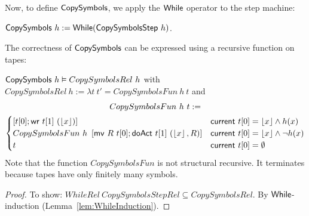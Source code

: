 Now, to define $\MS{CopySymbols}$, we apply the $\mathsf{While}$ operator to the step machine:
\begin{definition}[$\MS{CopySymbols}$]
  \label{def:CopySymbols}
  $\mathsf{CopySymbols}~h := \mathsf{While}(\mathsf{CopySymbolsStep}~h)$.
\end{definition}

The correctness of $\MS{CopySymbols}$ can be expressed using a recursive function on tapes:
\begin{lemma}
  \label{lem:CopySymbols_Realise}
  $\mathsf{CopySymbols}~h \mathrel{\vDash} CopySymbolsRel~h$
  with $CopySymbolsRel~h := \lambda t~t' = CopySymbolsFun~h~t$ and
  \begin{multline*}
    CopySymbolsFun~h~t :=\\
    \begin{cases}
      \left[ t[0]; \mathsf{wr}~t[1]~(\left\lfloor {x} \right\rfloor) \right]                                  & \mathsf{current}~t[0]=\left\lfloor {x} \right\rfloor \land h(x) \\
      CopySymbolsFun~h~\left[ \mathsf{mv}~R~t[0]; \mathsf{doAct}~t[1]~(\left\lfloor {x} \right\rfloor, R) \right] & \mathsf{current}~t[0]=\left\lfloor {x} \right\rfloor \land \lnot h(x) \\
      t                                                                       & \mathsf{current}~t[0]=\emptyset
    \end{cases}
  \end{multline*}
  Note that the function $CopySymbolsFun$ is not structural recursive.  It terminates because tapes have only finitely many symbols.
\end{lemma}
\begin{proof}
  To show: $WhileRel~CopySymbolsStepRel \subseteq CopySymbolsRel$.  By $\mathsf{While}$-induction (Lemma~\ref{lem:WhileInduction}).
\end{proof}

